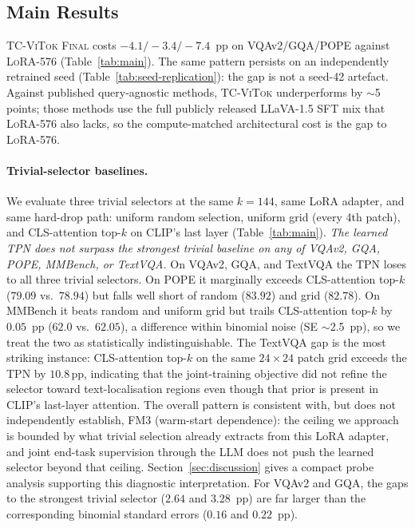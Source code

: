 \documentclass[runningheads]{llncs}
\begin{document}
\subsection{Main Results}
\label{sec:main-results}

\textsc{TC-ViTok Final} costs $-4.1/-3.4/-7.4$~pp on VQAv2/GQA/POPE
against \textsc{LoRA-576} (Table~\ref{tab:main}). The same pattern
persists on an independently retrained seed
(Table~\ref{tab:seed-replication}): the gap is not a seed-42 artefact.
Against published query-agnostic methods, \textsc{TC-ViTok}
underperforms by $\sim$5 points; those methods use the full publicly
released LLaVA-1.5 SFT mix that \textsc{LoRA-576} also lacks, so the
compute-matched architectural cost is the gap to \textsc{LoRA-576}.

\paragraph{Trivial-selector baselines.}
We evaluate three trivial selectors at the same $k{=}144$, same LoRA
adapter, and same hard-drop path: uniform random selection, uniform
grid (every 4th patch), and CLS-attention top-$k$ on CLIP's last
layer (Table~\ref{tab:main}). \emph{The learned TPN does not surpass
the strongest trivial baseline on any of VQAv2, GQA, POPE, MMBench,
or TextVQA.} On VQAv2, GQA, and TextVQA the TPN loses to all three
trivial selectors. On POPE it marginally exceeds CLS-attention top-$k$
($79.09$ vs.\ $78.94$) but falls well short of random ($83.92$) and
grid ($82.78$). On MMBench it beats random and uniform grid but trails
CLS-attention top-$k$ by $0.05$~pp ($62.0$ vs.\ $62.05$), a difference
within binomial noise (SE $\sim$2.5~pp), so we treat the two as
statistically indistinguishable. The
TextVQA gap is the most striking instance: CLS-attention top-$k$ on
the same $24{\times}24$ patch grid exceeds the TPN by $10.8$\,pp,
indicating that the joint-training objective did not refine the
selector toward text-localisation regions even though that prior is
present in CLIP's last-layer attention. The overall pattern is
consistent with, but does not independently establish, FM3
(warm-start dependence): the ceiling we approach is bounded by what
trivial selection already extracts from this LoRA adapter, and joint
end-task supervision through the LLM does not push the learned
selector beyond that ceiling. Section~\ref{sec:discussion} gives a
compact probe analysis supporting this diagnostic interpretation.
For VQAv2 and GQA, the gaps to the strongest trivial selector
($2.64$ and $3.28$~pp) are far larger than the corresponding binomial
standard errors ($0.16$ and $0.22$~pp).
\end{document}
